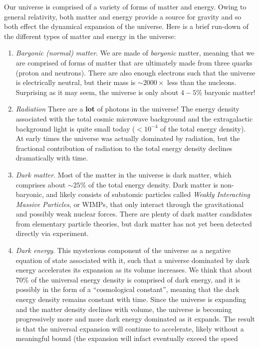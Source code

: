 \documentclass[]{article}
\begin{document}
Our universe is comprised of a variety of forms of matter and energy.  Owing to
general relativity, both matter and energy provide a source for gravity and so
both effect the dynamical expansion of the universe.  Here is a brief run-down
of the different types of matter and energy in the universe:

\begin{enumerate}
\item {\it Baryonic (normal) matter}. We are made of {\it baryonic} matter, meaning
that we are comprised of forms of matter that are ultimately made from three quarks
(proton and neutrons). There are also enough electrons such that the universe is
electrically neutral, but their mass is $\sim2000\times$ less than the nucleons.
Surprising as it may seem, the universe is only about $4-5\%$ baryonic matter!
\item {\it Radiation} There are a {\bf lot} of photons in the universe! The energy
density associated with the total cosmic microwave background and the extragalactic
background light is quite small today ($<10^{-4}$ of the total energy density). At
early times the universe was actually dominated by radiation, but the fractional
contribution of radiation to the total energy density declines dramatically with
time.
\item {\it Dark matter}. Most of the matter in the universe is dark matter, which
comprises about $\sim25\%$ of the total energy density. Dark matter is non-baryonic,
and likely consists of subatomic particles called {\it Weakly Interacting Massive Particles},
or WIMPs, that only interact through the gravitational and possibly weak nuclear forces.
There are plenty of dark matter candidates from elementary particle theories, but dark
matter has not yet been detected directly via experiment.
\item {\it Dark energy}. This mysterious component of the universe as a negative
equation of state associated with it, such that a universe dominated by dark
energy accelerates its expansion as its volume increases. We think that about $70\%$
of the universal energy density is comprised of dark energy, and it is possibly in
the form of a ``cosmological constant'', meaning that the dark energy density remains
constant with time. Since the universe is expanding and the matter density declines
with volume, the universe is becoming progressively more and more dark energy dominated
as it expands. The result is that the universal expansion will continue to accelerate,
likely without a meaningful bound (the expansion will infact eventually exceed the speed

\end{enumerate}
\end{document}
